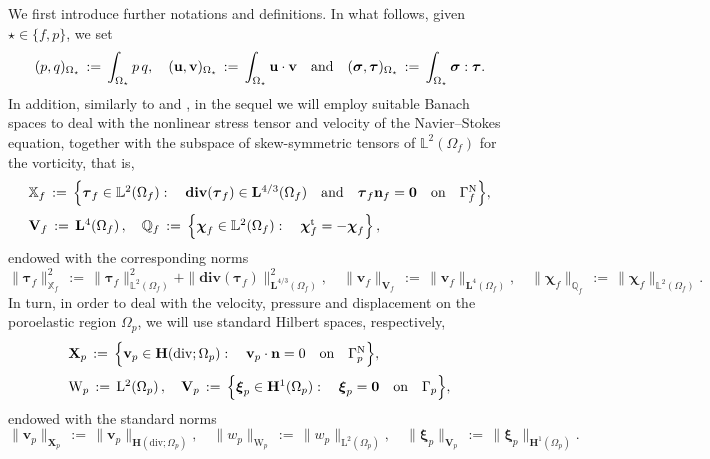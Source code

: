 \documentclass[11pt]{article}
\numberwithin{equation}{section}
\newcommand{\bsi}{{\boldsymbol\sigma}}
\newcommand{\btau}{{\boldsymbol\tau}}
\newcommand{\bchi}{{\boldsymbol\chi}}
\newcommand{\bxi}{{\boldsymbol\xi}}
\newcommand{\bv}{{\mathbf{v}}}
\newcommand{\bu}{\mathbf{u}}
\newcommand{\bn}{{\mathbf{n}}}
\newcommand{\0}{{\mathbf{0}}}
\def\bX{\mathbf{X}}
\def\bV{\mathbf{V}}
\newcommand{\bL}{\mathbf{L}}
\newcommand\bH{\mathbf{H}}
\newcommand\bbQ{\mathbb{Q}}
\newcommand\bbX{\mathbb{X}}
\newcommand\bbL{\mathbb{L}}
\def\L{\mathrm{L}}
\def\W{\mathrm{W}}
\def\rN{\mathrm{N}}
\def\rt{\mathrm{t}}
\def\bdiv{\mathbf{div}}
\def\div{\mathrm{div}}
\def\qon{{\quad\hbox{on}\quad}}
\def\qan{{\quad\hbox{and}\quad}}
\numberwithin{equation}{section}
\begin{document}
We first introduce further notations and definitions. In what follows, given $\star\in\big\{ f, p \big\}$, we set
\begin{equation*}
(p,q)_{\Omega_\star} \,:=\, \int_{\Omega_\star} p\,q,\quad 
(\bu,\bv)_{\Omega_\star} \,:=\, \int_{\Omega_\star} \bu\cdot\bv \qan
(\bsi,\btau)_{\Omega_\star} \,:=\, \int_{\Omega_\star} \bsi:\btau.
\end{equation*}
In addition, similarly to \cite{cgo2021} and \cite{cgos2017}, in the sequel we will employ suitable Banach spaces to deal with the nonlinear stress tensor and velocity of the Navier--Stokes equation, together with the subspace of skew-symmetric tensors of $\bbL^2(\Omega_f)$ for the vorticity, that is,
\begin{equation*}
\begin{array}{l}
\bbX_f \,:=\, \Big\{ \btau_f\in \bbL^2(\Omega_f) :\quad \bdiv(\btau_f)\in \bL^{4/3}(\Omega_f) \qan \btau_f\bn_f = \0 \qon \Gamma^\rN_f \Big\}, \\ [2ex] 
\bV_f \,:=\, \bL^4(\Omega_f)\,,\quad
\bbQ_f \,:=\, \Big\{ \bchi_f\in \bbL^2(\Omega_f) :\quad \bchi^\rt_f = - \bchi_f \Big\}\,,
\end{array}
\end{equation*}
endowed with the corresponding norms
\begin{equation*}
\|\btau_f\|^2_{\bbX_f} \,:=\, \|\btau_f\|^2_{\bbL^2(\Omega_f)} + \|\bdiv(\btau_f)\|^2_{\bL^{4/3}(\Omega_f)},\quad
\|\bv_f\|_{\bV_f} \,:=\, \|\bv_f\|_{\bL^4(\Omega_f)},\quad
\|\bchi_f\|_{\bbQ_f} \,:=\, \|\bchi_f\|_{\bbL^2(\Omega_f)}.
\end{equation*}
In turn, in order to deal with the velocity, pressure and displacement on the poroelastic region $\Omega_p$, we will use standard Hilbert spaces, respectively,
\begin{equation*}
\begin{array}{l}
\bX_p \,:=\, \Big\{ \bv_p\in \bH(\div;\Omega_p) :\quad \bv_p\cdot\bn = 0 \qon \Gamma^\rN_p \Big\}, \\ [2ex]
\W_p \,:=\, \L^2(\Omega_p)\,,\quad
\bV_p \,:=\, \Big\{ \bxi_p\in \bH^1(\Omega_p) :\quad \bxi_p = \0 \qon \Gamma_p \Big\}, 
\end{array}
\end{equation*}
endowed with the standard norms
\begin{equation*}
\|\bv_p\|_{\bX_p} \,:=\, \|\bv_p\|_{\bH(\div;\Omega_p)},\quad
\|w_p\|_{\W_p} \,:=\, \|w_p\|_{\L^2(\Omega_p)},\quad
\|\bxi_p\|_{\bV_p} \,:=\, \|\bxi_p\|_{\bH^1(\Omega_p)}.
\end{equation*}
\end{document}
